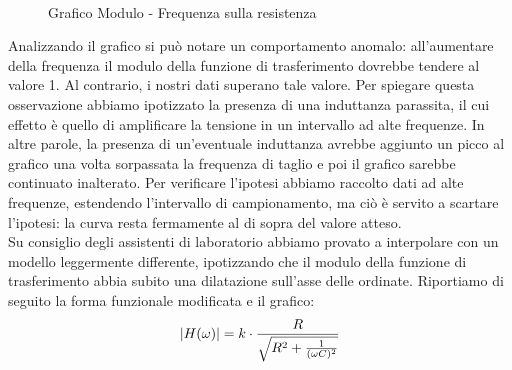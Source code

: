 \documentclass[letterpaper,12pt]{article}
\DeclarePairedDelimiter\abs{\lvert}{\rvert}     %
\begin{document}
\begin{figure}[h!]
    \centering
    \caption{Grafico Modulo - Frequenza sulla resistenza}
    \
    \label{fig:RC_R_modulo_soprauno}
\end{figure}
Analizzando il grafico si può notare un comportamento anomalo: all'aumentare della frequenza il modulo della funzione di trasferimento dovrebbe tendere al valore 1. Al contrario, i nostri dati superano tale valore. Per spiegare questa osservazione abbiamo ipotizzato la presenza di una induttanza parassita, il cui effetto è quello di amplificare la tensione in un intervallo ad alte frequenze. In altre parole, la presenza di un'eventuale induttanza avrebbe aggiunto un picco al grafico una volta sorpassata la frequenza di taglio e poi il grafico sarebbe continuato inalterato. Per verificare l'ipotesi abbiamo raccolto dati ad alte frequenze, estendendo l'intervallo di campionamento, ma ciò è servito a scartare l'ipotesi: la curva resta fermamente al di sopra del valore atteso. \\
Su consiglio degli assistenti di laboratorio abbiamo provato a interpolare con un modello leggermente differente, ipotizzando che il modulo della funzione di trasferimento abbia subito una dilatazione sull'asse delle ordinate. Riportiamo di seguito la forma funzionale modificata e il grafico:
$$\abs{H(\omega)} = k \cdot \frac{R}{\sqrt{R^2+\frac{1}{(\omega C)^2}}}$$ 
\end{document}
